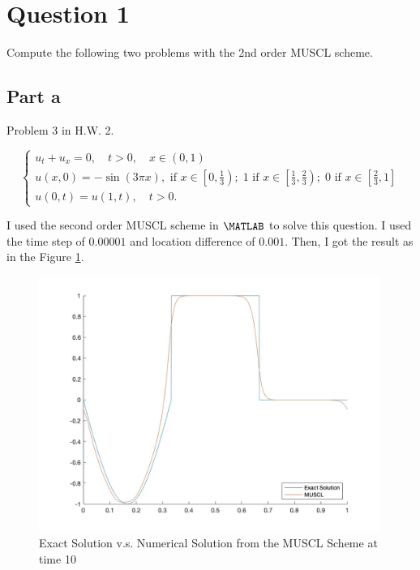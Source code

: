 \section{Question 1}

\begin{question}
    Compute the following two problems with the 2nd order MUSCL scheme.
\end{question}

\subsection{Part a}

\begin{question}
    Problem 3 in H.W. 2.
    
    $$\left\{\begin{array}{l}u_t+u_x=0, \quad t>0, \quad x \in(0,1) \\ u(x, 0)=-\sin (3 \pi x), \text{ if } x \in\left[0, \frac{1}{3}\right) ; \; 1 \text { if } x \in\left[\frac{1}{3}, \frac{2}{3}\right) ; \; 0 \text{ if } x \in\left[\frac{2}{3}, 1\right] \\ u(0, t)=u(1, t), \quad t>0 .\end{array}\right.$$
\end{question}

\begin{answer}
    I used the second order MUSCL scheme in $\MATLAB$ to solve this question. I used the time step of $0.00001$ and location difference of $0.001$. Then, I got the result as in the Figure \ref{fig:fig2}.
    \begin{figure}[H]
        \centering
        \includegraphics[width=0.99\textwidth]{Result2.jpg}
        \caption{\label{fig:fig2}Exact Solution v.s. Numerical Solution from the MUSCL Scheme at time 10}
    \end{figure}
\end{answer}

